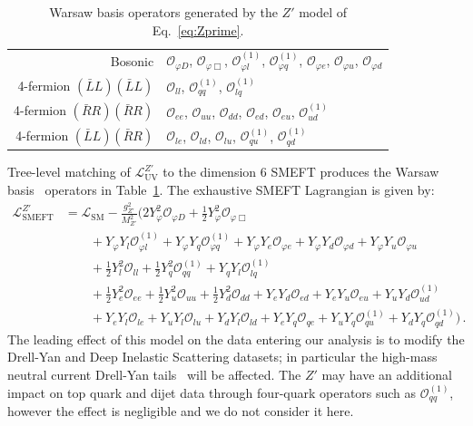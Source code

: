 \documentclass[withindex,glossary]{cam-thesis}
\begin{document}
%
\begin{table}[H]
\begin{center}
\begin{tabular}{ |r|l| }
 \hline
	Bosonic & $\mathcal{O}_{\varphi D}$, $\mathcal{O}_{\varphi \Box}$, $\mathcal{O}_{\varphi l}^{(1)}$, $\mathcal{O}_{\varphi q}^{(1)}$, $\mathcal{O}_{\varphi e}$, $\mathcal{O}_{\varphi u}$, $\mathcal{O}_{\varphi d}$ \\
	4-fermion $(\bar{L} L)(\bar{L} L)$ & $\mathcal{O}_{ll}$, $\mathcal{O}_{qq}^{(1)}$, $\mathcal{O}_{lq}^{(1)}$ \\
	4-fermion $(\bar{R} R)(\bar{R} R)$ & $\mathcal{O}_{ee}$, $\mathcal{O}_{uu}$, $\mathcal{O}_{dd}$, $\mathcal{O}_{ed}$, $\mathcal{O}_{eu}$, $\mathcal{O}_{ud}^{(1)}$\\
	4-fermion $(\bar{L} L)(\bar{R} R)$ & $\mathcal{O}_{l e}$, $\mathcal{O}_{l d}$, $\mathcal{O}_{l u}$, $\mathcal{O}_{q u}^{(1)}$, $\mathcal{O}_{q d}^{(1)}$\\
 \hline
\end{tabular}
\end{center}
	\caption{\label{tab:Zpops} Warsaw basis operators generated by the $Z'$ model of Eq.~\eqref{eq:Zprime}.}
\end{table}
%
Tree-level matching of $\mathcal{L}^{Z'}_{\text{UV}}$ to the dimension 6 SMEFT produces the Warsaw basis~\cite{deBlas:2017xtg} operators in Table~\ref{tab:Zpops}. The exhaustive SMEFT Lagrangian is given by:
\begin{equation} 
\label{eq:ZprimeEFT}
	\begin{split}
		\mathcal{L}^{Z'}_{\text{SMEFT}} &= \mathcal{L}_{\text{SM}} -\frac{g_{Z'}^{2}}{ M_{Z'}^{2}} \Big( { 2 Y_{\varphi}^{2} \mathcal{O}_{\varphi D} + \frac{1}{2} Y_{\varphi}^{2} \mathcal{O}_{\varphi \Box}}\\
		&\qquad+ Y_{\varphi} Y_{l} \mathcal{O}_{\varphi l}^{(1)} + Y_{\varphi} Y_{q}  \mathcal{O}_{\varphi q}^{(1)}  + Y_{\varphi} Y_{e}  \mathcal{O}_{\varphi e} +  Y_{\varphi} Y_{d}  \mathcal{O}_{\varphi d} + Y_{\varphi} Y_{u}  \mathcal{O}_{\varphi u} \\
		&\qquad+ \frac{1}{2} Y_{l}^{2} \mathcal{O}_{ll} + \frac{1}{2} Y_{q}^{2} \mathcal{O}_{qq}^{(1)} + Y_{q} Y_{l} \mathcal{O}_{lq}^{(1)}\\
		&\qquad+  \frac{1}{2} Y_{e}^{2} \mathcal{O}_{ee} + \frac{1}{2} Y_{u}^{2} \mathcal{O}_{uu} + \frac{1}{2} Y_{d}^{2} \mathcal{O}_{dd} + Y_{e} Y_{d} \mathcal{O}_{ed} + Y_{e} Y_{u} \mathcal{O}_{eu}  + Y_{u} Y_{d} \mathcal{O}_{ud}^{(1)}\\
		&\qquad+ Y_{e} Y_{l} \mathcal{O}_{l e} + Y_{u} Y_{l} \mathcal{O}_{l u} + Y_{d} Y_{l} \mathcal{O}_{l d} + Y_{e} Y_{q} \mathcal{O}_{q e} + Y_{u} Y_{q} \mathcal{O}_{q u}^{(1)} + Y_{d} Y_{q} \mathcal{O}_{q d}^{(1)} \Big) \, .
	\end{split}
\end{equation}
%
The leading effect of this model on the data entering our analysis is to modify the Drell-Yan and Deep Inelastic Scattering datasets; 
in particular the high-mass neutral current Drell-Yan 
tails~\cite{DYpaper} will be affected.  
The $Z'$ may have an additional impact on top quark and dijet data through four-quark operators such as $\mathcal{O}_{qq}^{(1)}$, however the 
effect is negligible and we do not consider it here.
\end{document}
